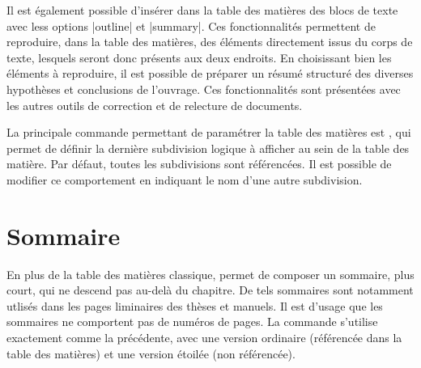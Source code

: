 Il est également possible d'insérer dans la table des matières des blocs de texte avec less options |outline| et |summary|. Ces fonctionnalités permettent de reproduire, dans la table des matières, des éléments directement issus du corps de texte, lesquels seront donc présents aux deux endroits. En choisissant bien les éléments à reproduire, il est possible de préparer un résumé structuré des diverses hypothèses et conclusions de l'ouvrage. Ces fonctionnalités sont présentées avec les autres outils de correction et de relecture de documents.

La principale commande permettant de paramétrer la table des matières est , qui permet de définir la dernière subdivision logique à afficher au sein de la table des matière. Par défaut, toutes les subdivisions sont référencées. Il est possible de modifier ce comportement en indiquant le nom d'une autre subdivision.

\begin{macro}
\end{macro}

\begin{noprint}
\end{noprint}


\section{Sommaire}

En plus de la table des matières classique, \frenchlaw permet de composer un sommaire, plus court, qui ne descend pas au-delà du chapitre. De tels sommaires sont notamment utlisés dans les pages liminaires des thèses et manuels. Il est d'usage que les sommaires ne comportent pas de numéros de pages. La commande  s'utilise exactement comme la précédente, avec une version ordinaire (référencée dans la table des matières) et une version étoilée (non référencée).

